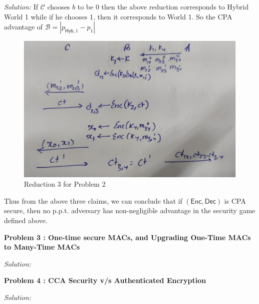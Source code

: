 \documentclass[a4paper, 11pt]{article}
\newenvironment{solution}
    {\textit{Solution:}}
    {\clearpage}
\newcommand{\prob}[1]{\begin{mdframed}[backgroundcolor=gray!20] \textbf{Problem #1}\end{mdframed}}
\newcommand{\hyb}{\mathsf{Hyb}}
\newcommand{\enc}{\mathsf{Enc}}
\newcommand{\dec}{\mathsf{Dec}}
\newcommand{\calB}{\mathcal{B}}
\newcommand{\calC}{\mathcal{C}}
\begin{document}
\begin{solution}
    If $\calC$ chooses $b$ to be 0 then the above reduction corresponds to Hybrid World 1  while if he chooses 1, then it corresponds to World 1. So the CPA advantage of $\calB=|p_{\hyb,1}-p_{1}|$
    
    \begin{figure}[!ht]
        \centering
        \includegraphics[scale=0.25]{images/Reduction23.jpg}
        \caption{Reduction 3 for Problem 2}
        \label{fig:p23}
    \end{figure}

    Thus from the above three claims, we can conclude that if $(\enc,\dec)$ is CPA secure, then no p.p.t. adversary has non-negligible advantage in the security game defined above.
\end{solution}

\prob{3 : One-time secure MACs, and Upgrading One-Time MACs to
    Many-Time MACs}
\begin{solution}

\end{solution}


\prob{4 : CCA Security v/s Authenticated Encryption}
\begin{solution}

\end{solution}
\end{document}
